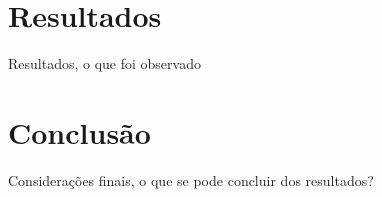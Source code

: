 \documentclass[11pt, a4paper]{article}
\begin{document}
\section{Resultados}
Resultados, o que foi observado

\section{Conclusão}
Considerações finais, o que se pode concluir dos resultados?


\end{document}
